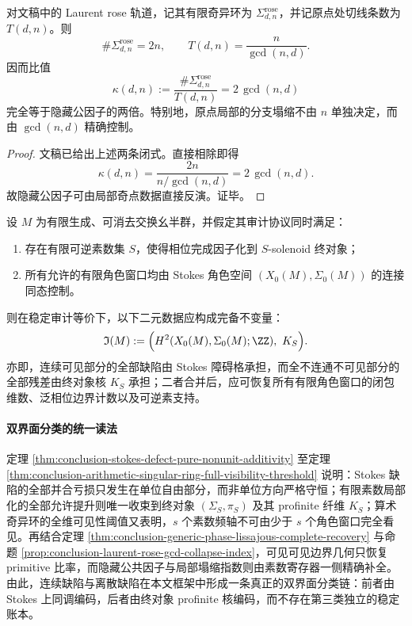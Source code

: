 \begin{proposition}\label{prop:conclusion-laurent-rose-gcd-collapse-index}
对文稿中的 Laurent rose 轨道，记其有限奇异环为 \(\Sigma_{d,n}^{\mathrm{rose}}\)，并记原点处切线条数为 \(T(d,n)\)。则
\[
\#\Sigma_{d,n}^{\mathrm{rose}}=2n,
\qquad
T(d,n)=\frac{n}{\gcd(n,d)}.
\]
因而比值
\[
\kappa(d,n):=
\frac{\#\Sigma_{d,n}^{\mathrm{rose}}}{T(d,n)}
=
2\,\gcd(n,d)
\]
完全等于隐藏公因子的两倍。特别地，原点局部的分支塌缩不由 \(n\) 单独决定，而由 \(\gcd(n,d)\) 精确控制。
\end{proposition}
\begin{proof}
文稿已给出上述两条闭式。直接相除即得
\[
\kappa(d,n)=\frac{2n}{n/\gcd(n,d)}=2\,\gcd(n,d).
\]
故隐藏公因子可由局部奇点数据直接反演。证毕。
\end{proof}

\begin{conjecture}\label{conj:conclusion-stokes-solenoid-double-interface-completeness}
设 \(M\) 为有限生成、可消去交换幺半群，并假定其审计协议同时满足：
\begin{enumerate}
  \item 存在有限可逆素数集 \(S\)，使得相位完成因子化到 \(S\)-solenoid 终对象；
  \item 所有允许的有限角色窗口均由 Stokes 角色空间 \((X_0(M),\Sigma_0(M))\) 的连接同态控制。
\end{enumerate}
则在稳定审计等价下，以下二元数据应构成完备不变量：
\[
\mathfrak I(M):=
\Bigl(
H^2(X_0(M),\Sigma_0(M);\ZZ),\ K_S
\Bigr).
\]
亦即，连续可见部分的全部缺陷由 Stokes 障碍格承担，而全不连通不可见部分的全部残差由终对象核 \(K_S\) 承担；二者合并后，应可恢复所有有限角色窗口的闭包维数、泛相位边界计数以及可逆素支持。
\end{conjecture}

\paragraph{双界面分类的统一读法}
定理 \ref{thm:conclusion-stokes-defect-pure-nonunit-additivity} 至定理 \ref{thm:conclusion-arithmetic-singular-ring-full-visibility-threshold} 说明：Stokes 缺陷的全部并合亏损只发生在单位自由部分，而非单位方向严格守恒；有限素数局部化的全部允许提升则唯一收束到终对象 \((\Sigma_S,\pi_S)\) 及其 profinite 纤维 \(K_S\)；算术奇异环的全维可见性阈值又表明，\(s\) 个素数频轴不可由少于 \(s\) 个角色窗口完全看见。再结合定理 \ref{thm:conclusion-generic-phase-lissajous-complete-recovery} 与命题 \ref{prop:conclusion-laurent-rose-gcd-collapse-index}，可见可见边界几何只恢复 primitive 比率，而隐藏公共因子与局部塌缩指数则由素数寄存器一侧精确补全。由此，连续缺陷与离散缺陷在本文框架中形成一条真正的双界面分类链：前者由 Stokes 上同调编码，后者由终对象 profinite 核编码，而不存在第三类独立的稳定账本。

\endinput
